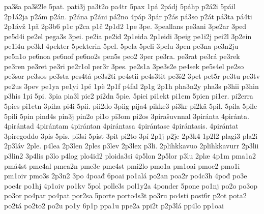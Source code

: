 {    pa3ša
    pa3š2le
    5pat.
    pati3j
    pa3t2o
    pa4tr
    5pax
    1pá
    2pádj
    5páhp
    p2á2i
    5páil
    2p1á2ja
    p2ám
    p2án.
    p2ána
    p2áni
    pá2no
    4páp
    3pár
    p2ás
    pá3so
    p2át
    pá3ta
    pá4ti
    2p1ávž
    1pã
    2p3b6
    p1c
    p2ca
    p1č
    2p1d2
    1pe
    3pe.
    3peallans
    pe3ani
    3pe2ar
    3ped
    pe5d4i
    pe2el
    pega3s
    3pei.
    pe2ia
    pe2id
    2p1eida
    2p1eidi
    3peig
    pe1i2j
    pei2l
    3p2ein
    pe1i4u
    pe3kl
    4pekter
    5pekterin
    5pel.
    5pela
    5peli
    3pelu
    3pen
    pe3na
    pe3n2ju
    pe5n1o
    pe6noa
    pe6nof
    pe6no2s
    pen5s
    peo2
    3per
    pe3ra.
    pe3rat
    pe3rá
    pe3rek
    pe3ren
    pe3ret
    pe3ri
    pe2r1ol
    per3r
    3pes.
    pe2s1a
    3pe3s2e
    pe4sek
    pe5s4el
    pe2so
    pe3sor
    pe3sos
    pe3sta
    pes4tá
    pe3s2ti
    pe4stii
    pe4s3tit
    pe3š2
    3pet
    pet5r
    pe3tu
    pe3tv
    pe2us
    3pev
    pe1ya
    pe1yi
    1pé
    1pè
    2p1f
    p4fal
    2p1g
    2p1h
    pha3n2y
    pha3s
    p3hii
    p3hin
    p3his
    1pi
    5pi.
    3pia
    pia3l
    pic2
    pi2dn
    5pie.
    5piei
    pi1ekt
    pi1em
    5pien
    pi1er.
    pi2erra
    5pies
    pi1etn
    3piha
    pi4i
    5pii.
    pii2do
    3piig
    pija4
    pikke3
    pi3kr
    pi2kä
    5pil.
    5pila
    5pile
    5pili
    5pin
    pind4s
    pin3j
    pin2o
    pi1o
    pi3om
    pi2os
    3pirašuvnnal
    3piránta
    4piránta.
    4pirántad
    4pirántam
    4pirántan
    4pirántasa
    4pirántase
    4pirántasis.
    4pirántat
    3piregoddo
    3pis
    5pis.
    pi3si
    5pist
    3pit
    pi2to
    3pí
    2p1j
    p2je
    2p3k4
    1p2l2
    plagi3
    pla2i
    2p3láv
    2ple.
    p4lea
    2p3len
    2ples
    p3lev
    2p3lex
    p3li.
    2plihkkavuo
    2plihkkavurr
    2p3lii
    p3lin2
    3p4lis
    p3lo
    p4log
    plo4id2
    ploida3si
    4p5lon
    2p5lor
    p3lu
    2plæ
    4p1m
    pma1a2
    pmá4st
    pme4al
    pmea2n
    pme3e
    pme4st
    pmi2lo
    pmo1a
    pm1oai
    pmoe2
    pmo1i
    pm1oiv
    pmo3s
    2p3n2
    3po
    4poađ
    6poai
    po1alá
    po2an
    poa2r
    po4c3h
    4pođ
    po3e
    poe4r
    po1hj
    4p1oiv
    po1kv
    5pol
    polle3s
    pol1y2a
    4ponder
    5pone
    po1nj
    po2o
    po3op
    po3or
    po4par
    po4pat
    por2sa
    5porte
    porto4s3t
    po3ru
    po4sti
    post6r
    p2ot
    pota2
    po2tá
    po2to2
    po2u
    po1y
    6p1p
    ppa1u
    ppe2a
    ppi2t
    p2p3lá
    pp4lo
    pp1oai
}
